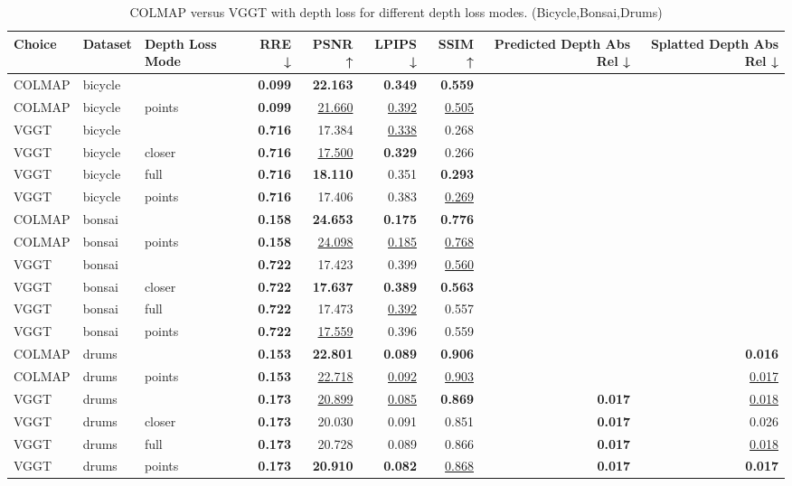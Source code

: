 \begin{table}[H]
\caption{\ifdefined\customcaption \customcaption \else COLMAP versus VGGT with depth loss for different depth loss modes. (Bicycle,Bonsai,Drums) \fi}
\label{tab:05_depth_loss_mode_bicycle,bonsai,drums}
\centering
\scriptsize
\begin{tabular}{lllrrrrrr}
\toprule
Choice & Dataset & Depth Loss Mode & RRE ↓ & PSNR ↑ & LPIPS ↓ & SSIM ↑ & Predicted Depth Abs Rel ↓ & Splatted Depth Abs Rel ↓ \\
\midrule
COLMAP & bicycle &  & \textbf{0.099} & \textbf{22.163} & \textbf{0.349} & \textbf{0.559} &  &  \\
COLMAP & bicycle & points & \textbf{0.099} & \underline{21.660} & \underline{0.392} & \underline{0.505} &  &  \\
\midrule
VGGT & bicycle &  & \textbf{0.716} & 17.384 & \underline{0.338} & 0.268 &  &  \\
VGGT & bicycle & closer & \textbf{0.716} & \underline{17.500} & \textbf{0.329} & 0.266 &  &  \\
VGGT & bicycle & full & \textbf{0.716} & \textbf{18.110} & 0.351 & \textbf{0.293} &  &  \\
VGGT & bicycle & points & \textbf{0.716} & 17.406 & 0.383 & \underline{0.269} &  &  \\
\midrule
COLMAP & bonsai &  & \textbf{0.158} & \textbf{24.653} & \textbf{0.175} & \textbf{0.776} &  &  \\
COLMAP & bonsai & points & \textbf{0.158} & \underline{24.098} & \underline{0.185} & \underline{0.768} &  &  \\
\midrule
VGGT & bonsai &  & \textbf{0.722} & 17.423 & 0.399 & \underline{0.560} &  &  \\
VGGT & bonsai & closer & \textbf{0.722} & \textbf{17.637} & \textbf{0.389} & \textbf{0.563} &  &  \\
VGGT & bonsai & full & \textbf{0.722} & 17.473 & \underline{0.392} & 0.557 &  &  \\
VGGT & bonsai & points & \textbf{0.722} & \underline{17.559} & 0.396 & 0.559 &  &  \\
\midrule
COLMAP & drums &  & \textbf{0.153} & \textbf{22.801} & \textbf{0.089} & \textbf{0.906} &  & \textbf{0.016} \\
COLMAP & drums & points & \textbf{0.153} & \underline{22.718} & \underline{0.092} & \underline{0.903} &  & \underline{0.017} \\
\midrule
VGGT & drums &  & \textbf{0.173} & \underline{20.899} & \underline{0.085} & \textbf{0.869} & \textbf{0.017} & \underline{0.018} \\
VGGT & drums & closer & \textbf{0.173} & 20.030 & 0.091 & 0.851 & \textbf{0.017} & 0.026 \\
VGGT & drums & full & \textbf{0.173} & 20.728 & 0.089 & 0.866 & \textbf{0.017} & \underline{0.018} \\
VGGT & drums & points & \textbf{0.173} & \textbf{20.910} & \textbf{0.082} & \underline{0.868} & \textbf{0.017} & \textbf{0.017} \\
\bottomrule
\end{tabular}
\end{table}